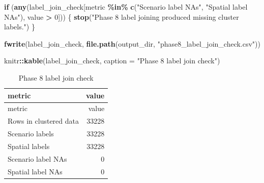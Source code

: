 \documentclass[
]{article}
\newenvironment{Shaded}{\begin{snugshade}}{\end{snugshade}}
\newcommand{\AttributeTok}[1]{\textcolor[rgb]{0.13,0.29,0.53}{#1}}
\newcommand{\ControlFlowTok}[1]{\textcolor[rgb]{0.13,0.29,0.53}{\textbf{#1}}}
\newcommand{\DecValTok}[1]{\textcolor[rgb]{0.00,0.00,0.81}{#1}}
\newcommand{\FunctionTok}[1]{\textcolor[rgb]{0.13,0.29,0.53}{\textbf{#1}}}
\newcommand{\NormalTok}[1]{#1}
\newcommand{\SpecialCharTok}[1]{\textcolor[rgb]{0.81,0.36,0.00}{\textbf{#1}}}
\newcommand{\StringTok}[1]{\textcolor[rgb]{0.31,0.60,0.02}{#1}}
\begin{document}
\begin{Shaded}
\begin{Highlighting}[]
\ControlFlowTok{if}\NormalTok{ (}\FunctionTok{any}\NormalTok{(label\_join\_check[metric }\SpecialCharTok{\%in\%} \FunctionTok{c}\NormalTok{(}\StringTok{"Scenario label NAs"}\NormalTok{, }\StringTok{"Spatial label NAs"}\NormalTok{), value }\SpecialCharTok{\textgreater{}} \DecValTok{0}\NormalTok{])) \{}
  \FunctionTok{stop}\NormalTok{(}\StringTok{"Phase 8 label joining produced missing cluster labels."}\NormalTok{)}
\NormalTok{\}}

\FunctionTok{fwrite}\NormalTok{(label\_join\_check, }\FunctionTok{file.path}\NormalTok{(output\_dir, }\StringTok{"phase8\_label\_join\_check.csv"}\NormalTok{))}

\NormalTok{knitr}\SpecialCharTok{::}\FunctionTok{kable}\NormalTok{(label\_join\_check, }\AttributeTok{caption =} \StringTok{"Phase 8 label join check"}\NormalTok{)}
\end{Highlighting}
\end{Shaded}

\begin{longtable}[]{@{}lr@{}}
\caption{Phase 8 label join check}\tabularnewline
\toprule\noalign{}
metric & value \\
\midrule\noalign{}
\endfirsthead
\toprule\noalign{}
metric & value \\
\midrule\noalign{}
\endhead
\bottomrule\noalign{}
\endlastfoot
Rows in clustered data & 33228 \\
Scenario labels & 33228 \\
Spatial labels & 33228 \\
Scenario label NAs & 0 \\
Spatial label NAs & 0 \\
\end{longtable}
\end{document}
